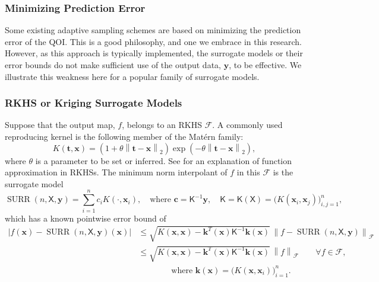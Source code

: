 \documentclass[11pt]{NSFamsart}
\DeclareMathOperator{\SURR}{SURR}
\newcommand{\mK}{\mathsf{K}}
\newcommand{\mX}{\mathsf{X}}
\newcommand{\bc}{{\boldsymbol{c}}}
\newcommand{\bx}{{\boldsymbol{x}}}
\newcommand{\bk}{{\boldsymbol{k}}}
\newcommand{\by}{{\boldsymbol{y}}}
\newcommand{\bt}{{\boldsymbol{t}}}
\newcommand{\calf}{{\mathcal{F}}}
\def\abs#1{\ensuremath{\left \lvert #1 \right \rvert}}
\newcommand{\norm}[2][{}]{\ensuremath{\left \lVert #2 \right \rVert}_{#1}}
\begin{document}
\subsubsection{Minimizing Prediction Error} \label{sec:MinPredErr}

Some existing adaptive sampling schemes are based on minimizing the prediction error of the QOI.  This is a good philosophy, and one we embrace in this research.  However, as this approach is typically implemented, the surrogate models or their error bounds do not make sufficient use of the output data, $\by$, to be effective.   We illustrate this weakness here for a popular family of surrogate models.

\subsubsection{RKHS or Kriging Surrogate Models} \label{sec:RKHSKrigSurrModel}

Suppose that the output map, $f$, belongs to an RKHS $\calf$.  A commonly used reproducing kernel is the following member of the Mat\'ern family:
\begin{equation} \label{MatKer}
    K(\bt,\bx) = (1 + \theta \norm[2]{\bt-\bx}) \exp(-\theta\norm[2]{\bt-\bx}),
\end{equation}
where $\theta$ is a parameter to be set or inferred.  See \cite{Buh00, Fas07a, FasMcC15a, ForFly15a, ForEtal09, SchWen06a, Wen05a} for an explanation of function approximation in RKHSs.  The minimum norm interpolant of $f$ in this $\calf$ is the surrogate model
\begin{equation} \label{appxExOne}
    \SURR(n,\mX,\by) = \sum_{i=1}^n c_i K(\cdot, \bx_i), \quad \text{where } \bc = \mK^{-1} \by, \quad \mK = \mK(\mX) = \bigl( K(\bx_i,\bx_j) \bigr)_{i,j=1}^n, 
\end{equation}
which has a known pointwise error bound of
\begin{align}
\label{RKHSErrBd}
    \abs{f(\bx) - \SURR(n,\mX,\by)(\bx)} & \le \sqrt{K(\bx,\bx) - \bk^T(\bx) \mK^{-1} \bk(\bx)} \, \norm[\calf]{f - \SURR(n,\mX,\by)} \\
    \nonumber
    & \le \sqrt{K(\bx,\bx) - \bk^T(\bx) \mK^{-1} \bk(\bx)} \, \norm[\calf]{f} \qquad \forall f \in \calf, \\
    \nonumber
    & \qquad \qquad \text{where }  \bk(\bx) = \bigl(K(\bx,\bx_i) \bigr)_{i=1}^n.
\end{align}
\end{document}
